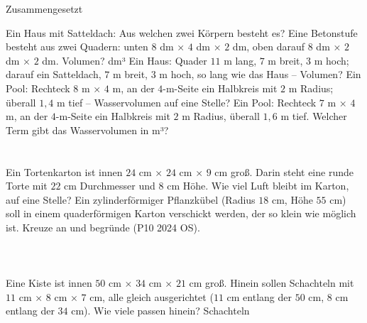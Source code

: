 \setcounter{aufgabe}{24}

\begin{aufgabe}{Zusammengesetzt}
\begin{teile}
\teil Ein Haus mit Satteldach: Aus welchen zwei Körpern besteht es?
\teil Eine Betonstufe besteht aus zwei Quadern: unten $8$ dm × $4$ dm × $2$ dm, oben darauf $8$ dm × $2$ dm × $2$ dm. Volumen? \leerfeld dm³
\teil Ein Haus: Quader $11$ m lang, $7$ m breit, $3$ m hoch; darauf ein Satteldach, $7$ m breit, $3$ m hoch, so lang wie das Haus – Volumen? \leerfeld[m³]
\teil Ein Pool: Rechteck $8$ m × $4$ m, an der $4$-m-Seite ein Halbkreis mit $2$ m Radius; überall $1{,}4$ m tief – Wasservolumen auf eine Stelle? \leerfeld[m³]
\teil Ein Pool: Rechteck $7$ m × $4$ m, an der $4$-m-Seite ein Halbkreis mit $2$ m Radius, überall $1{,}6$ m tief. Welcher Term gibt das Wasservolumen in m³? \\  \\  \\ 
\teil Ein Tortenkarton ist innen $24$ cm × $24$ cm × $9$ cm groß. Darin steht eine runde Torte mit $22$ cm Durchmesser und $8$ cm Höhe. Wie viel Luft bleibt im Karton, auf eine Stelle? \leerfeld[cm³]
\teil Ein zylinderförmiger Pflanzkübel (Radius $18$ cm, Höhe $55$ cm) soll in einem quaderförmigen Karton verschickt werden, der so klein wie möglich ist. Kreuze an und begründe \hfill (P10 2024 OS). \\  \\  \\  \\ 
\teil Eine Kiste ist innen $50$ cm × $34$ cm × $21$ cm groß. Hinein sollen Schachteln mit $11$ cm × $8$ cm × $7$ cm, alle gleich ausgerichtet ($11$ cm entlang der $50$ cm, $8$ cm entlang der $34$ cm). Wie viele passen hinein? \leerfeld Schachteln

\end{teile}
\end{aufgabe}
